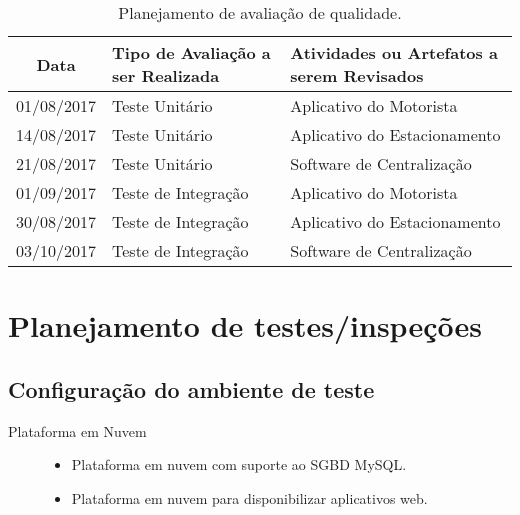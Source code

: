 \begin{table}[h]
	\begin{tabularx}{.9\textwidth}{| c | X | X |}
		\hline
		\textbf{Data} & \textbf{Tipo de Avaliação a ser Realizada} & \textbf{Atividades ou Artefatos a serem Revisados} \\
		\hline
		01/08/2017    & Teste Unitário                              & Aplicativo do Motorista                            \\
		\hline
		14/08/2017    & Teste Unitário                              & Aplicativo do Estacionamento                       \\
		\hline
		21/08/2017    & Teste Unitário                              & Software de Centralização                        \\
		\hline
		01/09/2017    & Teste de Integração                        & Aplicativo do Motorista                            \\
		\hline
		30/08/2017    & Teste de Integração                        & Aplicativo do Estacionamento                       \\
		\hline
		03/10/2017    & Teste de Integração                        & Software de Centralização                        \\
		\hline
	\end{tabularx}
	\centering
	\caption{Planejamento de avaliação de qualidade.}
	\label{tab:quality-evaluation-plan}
\end{table}

\section{Planejamento de testes/inspeções}

\subsection{Configuração do ambiente de teste}

\begin{description}
	\item[Plataforma em Nuvem] \hfill
	\begin{itemize}
		\item Plataforma em nuvem com suporte ao SGBD MySQL.
		\item Plataforma em nuvem para disponibilizar aplicativos web.
	\end{itemize}
\end{description}


